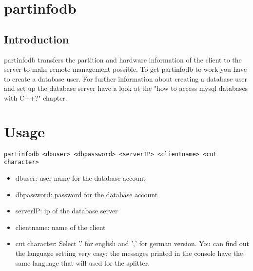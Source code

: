 \section{partinfodb}
\subsection{Introduction}
partinfodb transfers the partition and hardware information of the client to the server to make remote management possible. To get partinfodb to work you have to create a database user. For further information about creating a database user and set up the database server have a look at the "how to access mysql databases with C++?" chapter.

\section{Usage}
\begin{verbatim}
partinfodb <dbuser> <dbpassword> <serverIP> <clientname> <cut character>
\end{verbatim} 
\begin{itemize}
\item dbuser: user name for the database account 
\item dbpassword: password for the database account 
\item serverIP: ip of the database server
\item clientname: name of the client
\item cut character: Select '.' for english and ',' for german version. You can find out the language setting very easy: the messages printed in the console have the same language that will used for the splitter.
\end{itemize}